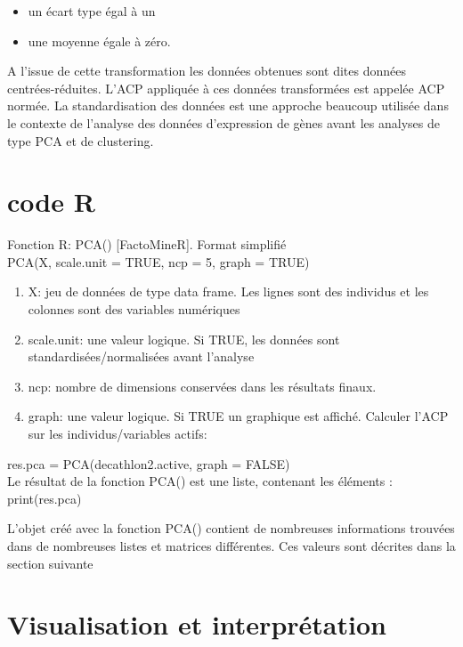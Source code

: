 \documentclass[10pt,a4paper]{report}
\begin{document}
\begin{itemize}
\item un écart type égal à un 
\item une moyenne égale à zéro.
\end{itemize}
 
 A l’issue de cette transformation les données obtenues sont dites données centrées-réduites. L’ACP appliquée à ces données transformées est appelée ACP normée.
La standardisation des données est une approche beaucoup utilisée dans le contexte de l’analyse des données d’expression de gènes avant les analyses de type PCA et de clustering.


\section{code R}

Fonction R: PCA() [FactoMineR]. Format simplifié\\

PCA(X, scale.unit = TRUE, ncp = 5, graph = TRUE)

\begin{enumerate}
\item X: jeu de données de type data frame. Les lignes sont des individus et les colonnes sont des variables numériques
\item scale.unit: une valeur logique. Si TRUE, les données sont standardisées/normalisées avant l’analyse
\item  ncp: nombre de dimensions conservées dans les résultats finaux.
\item  graph: une valeur logique. Si TRUE un graphique est affiché.
Calculer l’ACP sur les individus/variables actifs:

\end{enumerate}


res.pca = PCA(decathlon2.active, graph = FALSE)\\

Le résultat de la fonction PCA() est une liste, contenant les éléments :\\

print(res.pca)
 

L’objet créé avec la fonction PCA() contient de nombreuses informations trouvées dans de nombreuses listes et matrices différentes. Ces valeurs sont décrites dans la section suivante

\section{Visualisation et  interprétation }
\end{document}
